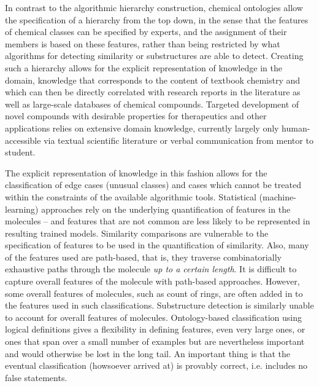 \documentclass[10pt]{bmc_article}
\newenvironment{bmcformat}{\baselineskip20pt\sloppy\setboolean{publ}{false}}{\baselineskip20pt\sloppy}
\begin{document}
\begin{bmcformat}
In contrast to the algorithmic hierarchy construction, chemical ontologies allow the specification of a hierarchy from the top down, in the sense that the features of chemical classes can be specified by experts, and the assignment of their members is based on these features, rather than being restricted by what algorithms for detecting similarity or substructures are able to detect. Creating such a hierarchy allows for the explicit representation of knowledge in the domain, knowledge that corresponds to the content of textbook chemistry and which can then be directly correlated with research reports in the literature as well as large-scale databases of chemical compounds. Targeted development of novel compounds with desirable properties for therapeutics and other applications relies on extensive domain knowledge, currently largely only human-accessible via textual scientific literature or verbal communication from mentor to student. 

The explicit representation of knowledge in this fashion allows for the classification of edge cases (unusual classes)
 and cases which cannot be treated within the constraints of the available algorithmic tools. %
 Statistical (machine-learning) approaches rely on the underlying quantification of features in the molecules -- and features that are not common are less likely %
 to be represented in resulting trained models. Similarity comparisons are vulnerable to the specification of features to be used in the quantification of similarity.  
Also, many of the features used are path-based, that is, they traverse combinatorially exhaustive paths through the molecule \textit{up to a certain length}.  It is difficult to capture overall features of the molecule with path-based approaches.  However, some overall features of molecules, such as count of rings, are often added in to the features used in such classifications. Substructure detection is similarly unable to account for overall features of molecules.  %
Ontology-based classification using logical definitions gives a flexibility in defining features, even very large ones, or ones that span over a small number of examples but are nevertheless important and would otherwise be lost in the long tail.  An important thing is that the eventual classification (howsoever arrived at) is provably correct, i.e. includes no false statements. 


\end{bmcformat}
\end{document}
